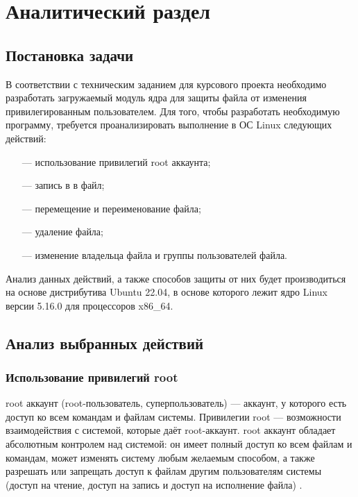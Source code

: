 \section{\large Аналитический раздел}


\subsection{Постановка задачи}

В соответствии с техническим заданием для курсового проекта необходимо разработать загружаемый модуль ядра для защиты файла от изменения привилегированным пользователем. 
Для того, чтобы разработать необходимую программу, требуется проанализировать выполнение в ОС Linux следующих действий:
\begin{itemize}[leftmargin=1.6\parindent]
	\item[---] использование привилегий root аккаунта;
	\item[---] запись в в файл; 
	\item[---] перемещение и переименование файла;
	\item[---] удаление файла;
	\item[---] изменение владельца файла и группы пользователей файла.
\end{itemize}

Анализ данных действий, а также способов защиты от них будет производиться на основе дистрибутива Ubuntu 22.04, в основе которого лежит ядро Linux версии 5.16.0 для процессоров x86\_64.

\subsection{Анализ выбранных действий}

\subsubsection{Использование привилегий root}

root аккаунт (root-пользователь, суперпользователь) --- аккаунт, у которого есть доступ ко всем командам и файлам системы.  Привилегии root --- возможности взаимодействия с системой, которые даёт root-аккаунт. root аккаунт обладает абсолютным контролем над системой: он имеет полный доступ ко всем файлам и командам, может изменять систему любым желаемым способом, а также разрешать или запрещать доступ к файлам другим пользователям системы (доступ на чтение, доступ на запись и доступ на исполнение файла) \cite{root-definition}.

